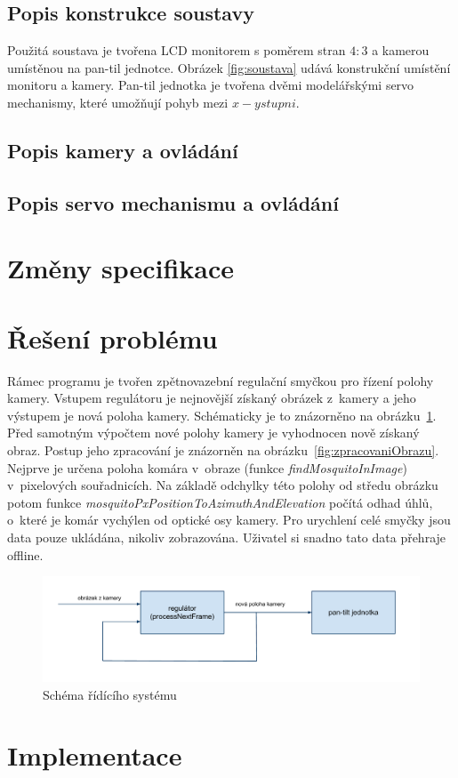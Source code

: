 \documentclass[a4paper,10pt]{article}
\begin{document}
		\subsection{Popis konstrukce soustavy}
		Použitá soustava je tvořena LCD monitorem s poměrem stran $4:3$ a kamerou \cite{kamera} umístěnou na pan-til jednotce.
		Obrázek \ref{fig:soustava} udává konstrukční umístění monitoru a kamery. 
		Pan-til jednotka je tvořena dvěmi modelářskými servo mechanismy, které umožňují pohyb mezi $x-y stupni$.

	       \subsection{Popis kamery a ovládání}

	       \subsection{Popis servo mechanismu a ovládání}

\section{Změny specifikace}

\section{Řešení problému}

		Rámec programu je tvořen zpětnovazební regulační smyčkou pro řízení polohy
		kamery. Vstupem regulátoru je nejnovější získaný obrázek z~kamery a jeho
		výstupem je nová poloha kamery. Schématicky je to znázorněno na
		obrázku~\ref{fig:ridiciSystem}.  Před samotným výpočtem nové polohy kamery
		je vyhodnocen nově zís\-ka\-ný obraz. Postup jeho zpracování je znázorněn na
		obrázku~\ref{fig:zpracovaniObrazu}.  Nejprve je určena poloha komára v~obraze
		(funkce \textit{findMosquitoInImage}) v~pixelových sou\-řad\-ni\-cích. Na základě odchylky
		této polohy od středu obrázku potom funkce
		\textit{mos\-quito\-Px\-PositionToAzimuthAndElevation} počítá odhad úhlů, o~které je
		komár vy\-chý\-len od optické osy kamery. Pro urychlení celé smyčky jsou data pouze
		ukládána, nikoliv zobrazována. Uživatel si snadno tato data přehraje offline.

		\begin{figure}[!h]
			\centering
			 \includegraphics[width=1\columnwidth]{pics/schema_ridiciho_systemu}
			 \caption{Schéma řídícího systému}\label{fig:ridiciSystem}
		\end{figure}

\section{Implementace}
\end{document}
